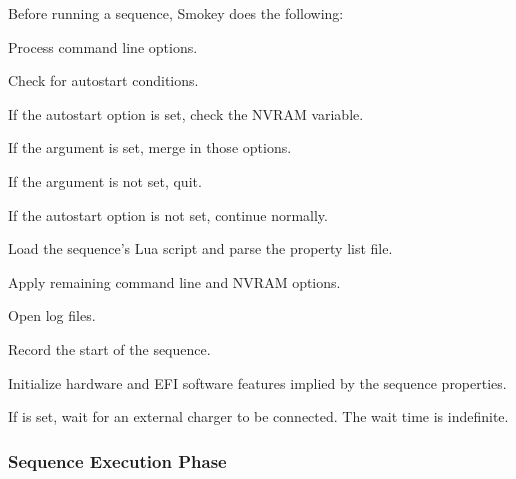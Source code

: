 Before running a sequence, Smokey does the following:

\begin{Process}

\item Process command line options.

\item Check for autostart conditions.

	\begin{Process}

	\item If the autostart option is set, check the  NVRAM
	variable.

		\begin{Process}

		\item If the  argument is set, merge in those options.

		\item If the  argument is not set, quit.

		\end{Process}

	\item If the autostart option is not set, continue normally.

	\end{Process}

\item Load the sequence's Lua script and parse the property list file.

\item Apply remaining command line and NVRAM options.

\item Open log files.

\item Record the start of the sequence.

\item Initialize hardware and EFI software features implied by the sequence
properties.

\item If  is set, wait for an external charger to be
connected.  The wait time is indefinite.

\end{Process}

\subsubsection{Sequence Execution Phase}

